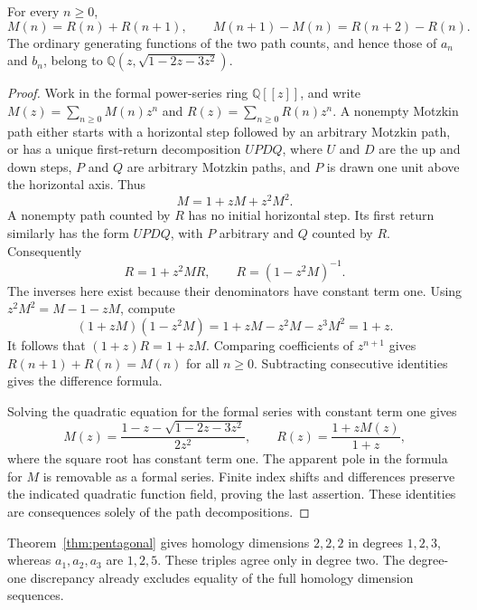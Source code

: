\begin{proposition}
\label{prop:one-sequence}
For every $n\ge0$,
\[
 M(n)=R(n)+R(n+1),\qquad
 M(n+1)-M(n)=R(n+2)-R(n).
\]
The ordinary generating functions of the two path counts, and hence those
of $a_n$ and $b_n$, belong to
$\mathbb Q(z,\sqrt{1-2z-3z^2})$.
\end{proposition}
\begin{proof}
Work in the formal power-series ring $\mathbb Q[[z]]$, and write
$M(z)=\sum_{n\ge0}M(n)z^n$ and $R(z)=\sum_{n\ge0}R(n)z^n$.
A nonempty Motzkin path either starts with a horizontal step followed by
an arbitrary Motzkin path, or has a unique first-return decomposition
$U P D Q$, where $U$ and $D$ are the up and down steps,
$P$ and $Q$ are arbitrary Motzkin paths, and $P$ is drawn
one unit above the horizontal axis.  Thus
\[
 M=1+zM+z^2M^2.
\]
A nonempty path counted by $R$ has no initial horizontal step.  Its first
return similarly has the form $U P D Q$, with $P$ arbitrary and $Q$ counted
by $R$.  Consequently
\[
 R=1+z^2MR,\qquad R=(1-z^2M)^{-1}.
\]
The inverses here exist because their denominators have constant term one.
Using $z^2M^2=M-1-zM$, compute
\[
 (1+zM)(1-z^2M)
 =1+zM-z^2M-z^3M^2=1+z.
\]
It follows that $(1+z)R=1+zM$.  Comparing coefficients of $z^{n+1}$ gives
$R(n+1)+R(n)=M(n)$ for all $n\ge0$.  Subtracting consecutive identities
gives the difference formula.

Solving the quadratic equation for the formal series with constant term
one gives
\[
 M(z)=\frac{1-z-\sqrt{1-2z-3z^2}}{2z^2},\qquad
 R(z)=\frac{1+zM(z)}{1+z},
\]
where the square root has constant term one.  The apparent pole in the
formula for $M$ is removable as a formal series.  Finite index shifts and
differences preserve the indicated quadratic function field, proving the
last assertion.  These identities are consequences solely of the path
decompositions.
\end{proof}

\begin{remark}
Theorem~\ref{thm:pentagonal} gives homology dimensions $2,2,2$ in degrees $1,2,3$, whereas $a_1,a_2,a_3$ are $1,2,5$. These triples agree only in degree two. The degree-one discrepancy already excludes equality of the full homology dimension sequences.
\end{remark}

